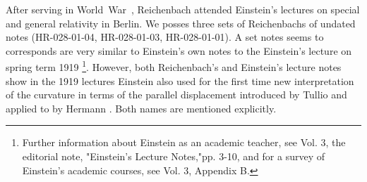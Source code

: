 {%


\label{Coordination}
After serving in World~War~, Reichenbach attended Einstein's lectures on special and general relativity in Berlin. We posses three sets of Reichenbachs of undated notes (HR-028-01-04, HR-028-01-03, HR-028-01-01). A set notes seems to corresponds are very similar to Einstein's own notes to the Einstein's lecture on spring term 1919 \citep{Einstein1919c}\footnote{Further information about Einstein as an academic teacher, see Vol. 3, the editorial note, "Einstein's Lecture Notes,"pp. 3-10, and for a survey of Einstein's academic courses, see Vol. 3, Appendix B.}.  However, both Reichenbach's and Einstein's lecture notes show in the 1919 lectures Einstein also used for the first time new interpretation of the curvature in terms of the parallel displacement introduced by Tullio \citet{Levi-Civita1916} and applied to \rt by Hermann \citet{Weyl1918}. Both names are mentioned explicitly. 

}
